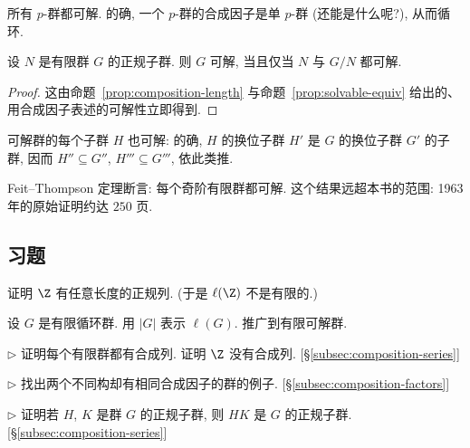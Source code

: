 \begin{example}
\label{ex:p-group-solvable}
所有 $p$-群都可解. 的确, 一个 $p$-群的合成因子是单 $p$-群 (还能是什么呢?), 从而循环.
\end{example}

\begin{corollary}
\label{cor:solvable-normal}
设 $N$ 是有限群 $G$ 的正规子群. 则 $G$ 可解, 当且仅当 $N$ 与 $G/N$ 都可解.
\end{corollary}

\begin{proof}
这由命题~\ref{prop:composition-length} 与命题~\ref{prop:solvable-equiv} 给出的、用合成因子表述的可解性立即得到.
\end{proof}

可解群的每个子群 $H$ 也可解: 的确, $H$ 的换位子群 $H'$ 是 $G$ 的换位子群 $G'$ 的子群, 因而 $H''\subseteq G''$, $H'''\subseteq G'''$, 依此类推.

Feit--Thompson 定理断言: 每个奇阶有限群都可解. 这个结果远超本书的范围: 1963 年的原始证明约达 $250$ 页.

\subsection*{习题}
{}

\begin{prob}
\label{ex:infinite-normal-series}
证明 $\Z$ 有任意长度的正规列. (于是 $\ell(\Z)$ 不是有限的.)
\end{prob}

\begin{prob}
\label{ex:cyclic-length}
设 $G$ 是有限循环群. 用 $|G|$ 表示 $\ell(G)$. 推广到有限可解群.
\end{prob}

\begin{prob}
\label{ex:finite-composition}
$\triangleright$ 证明每个有限群都有合成列. 证明 $\Z$ 没有合成列. [§\ref{subsec:composition-series}]
\end{prob}

\begin{prob}
\label{ex:same-factors}
$\triangleright$ 找出两个不同构却有相同合成因子的群的例子. [§\ref{subsec:composition-factors}]
\end{prob}

\begin{prob}
\label{ex:HK-normal}
$\triangleright$ 证明若 $H$, $K$ 是群 $G$ 的正规子群, 则 $HK$ 是 $G$ 的正规子群. [§\ref{subsec:composition-series}]
\end{prob}


